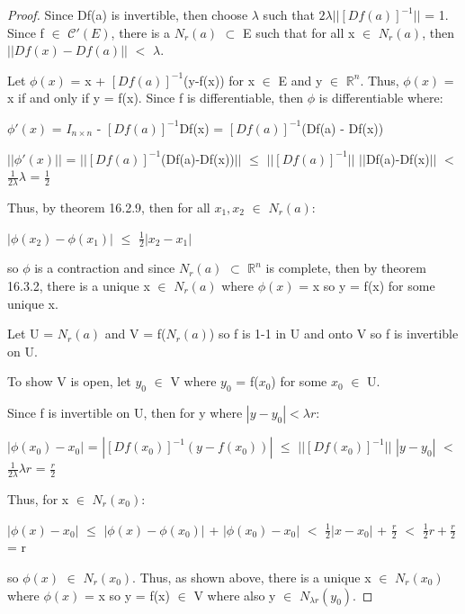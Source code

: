     \begin{proof}
        Since Df(a) is invertible, then choose $\lambda$
        such that $2\lambda ||[Df(a)]^{-1}||$ = 1.
        Since f $\in$ $\mathscr{C}'(E)$, there is a $N_r(a)$ $\subset$ E
        such that for all x $\in$ $N_r(a)$,
        then $||Df(x) - Df(a)||$ $<$ $\lambda$.

        Let $\phi(x)$ = x + $[Df(a)]^{-1}$(y-f(x)) for x $\in$ E and
        y $\in$ $\mathbb{R}^n$.
        Thus, $\phi(x)$ = x if and only if y = f(x).
        Since f is differentiable, then $\phi$ is differentiable where:
        
        \hspace{0.5cm}
        $\phi'(x)$
        = $I_{n \times n}$ - $[Df(a)]^{-1}$Df(x)
        = $[Df(a)]^{-1}$(Df(a) - Df(x))

        \hspace{0.5cm}
        $||\phi'(x)||$
        = $||[Df(a)]^{-1}$(Df(a)-Df(x))$||$
        $\leq$ $||[Df(a)]^{-1}||$ $||$Df(a)-Df(x)$||$
        $<$ $\frac{1}{2\lambda} \lambda$
        = $\frac{1}{2}$

        Thus, by {\color{red} theorem 16.2.9}, then for all
        $x_1,x_2$ $\in$ $N_r(a)$:

        \hspace{0.5cm}
        $|\phi(x_2) - \phi(x_1)|$
        $\leq$ $\frac{1}{2}|x_2 - x_1|$

        so $\phi$ is a contraction and since $N_r(a)$ $\subset$ $\mathbb{R}^n$
        is complete, then by {\color{red} theorem 16.3.2},
        there is a unique x $\in$ $N_r(a)$ where
        $\phi(x)$ = x so y = f(x) for some unique x.

        Let U = $N_r(a)$ and V = f($N_r(a)$) so f is 1-1 in U and onto V
        so f is invertible on U.
        
        To show V is open, let $y_0$ $\in$ V where $y_0$ = f($x_0$) for
        some $x_0$ $\in$ U.
        
        Since f is invertible on U, then for y where $|y - y_0| < \lambda r$:

        \hspace{0.5cm}
        $|\phi(x_0) - x_0|$
        = $|[Df(x_0)]^{-1}(y-f(x_0))|$
        $\leq$ $||[Df(x_0)]^{-1}||$ $|y-y_0|$
        $<$ $\frac{1}{2\lambda} \lambda r$
        = $\frac{r}{2}$

        Thus, for x $\in$ $N_r(x_0)$:

        \hspace{0.5cm}
        $|\phi(x) - x_0|$
        $\leq$ $|\phi(x) - \phi(x_0)|$ + $|\phi(x_0) - x_0|$
        $<$ $\frac{1}{2}|x-x_0|$ + $\frac{r}{2}$
        $<$ $\frac{1}{2}r + \frac{r}{2}$
        = r

        so $\phi(x)$ $\in$ $N_r(x_0)$.
        Thus, as shown above, there is a unique x $\in$ $N_r(x_0)$
        where $\phi(x)$ = x so y = f(x) $\in$ V
        where also y $\in$ $N_{\lambda r}(y_0)$.
    \end{proof}
